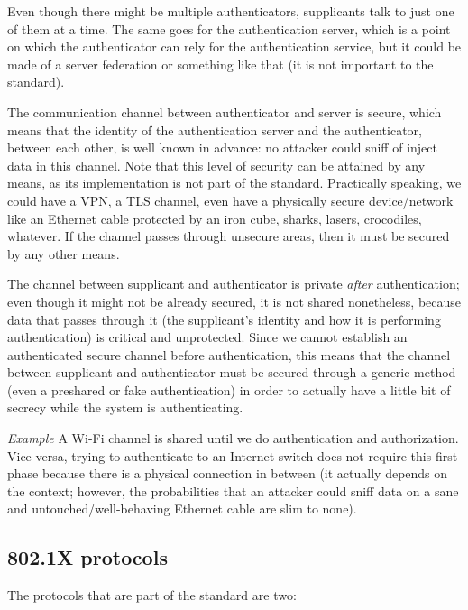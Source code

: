 Even though there might be multiple authenticators, supplicants talk to just one of them at a time. The same goes for the authentication server, which is a point on which the authenticator can rely for the authentication service, but it could be made of a server federation or something like that (it is not important to the standard).

The communication channel between authenticator and server is secure, which means that the identity of the authentication server and the authenticator, between each other, is well known in advance: no attacker could sniff of inject data in this channel. Note that this level of security  can be attained by any means, as its implementation is not part of the standard. Practically speaking, we could have a VPN, a TLS channel, even have a physically secure device/network like an Ethernet cable protected by an iron cube, sharks, lasers, crocodiles, whatever. If the channel passes through unsecure areas, then it must be secured by any other means.

The channel between supplicant and authenticator is private \textit{after} authentication; even though it might not be already secured, it is not shared nonetheless, because data that passes through it (the supplicant's identity and how it is performing authentication) is critical and unprotected. Since we cannot establish an authenticated secure channel before authentication, this means that the channel between supplicant and authenticator must be secured through a generic method (even a preshared or fake authentication) in order to actually have a little bit of secrecy while the system is authenticating.

\vspace{0.5em}

\emph{Example} A Wi-Fi channel is shared until we do authentication and authorization. Vice versa, trying to authenticate to an Internet switch does not require this first phase because there is a physical connection in between (it actually depends on the context; however, the probabilities that an attacker could sniff data on a sane and untouched/well-behaving Ethernet cable are slim to none).

\vspace{0.5em}
 

\subsection{802.1X protocols}
The protocols that are part of the standard are two:


